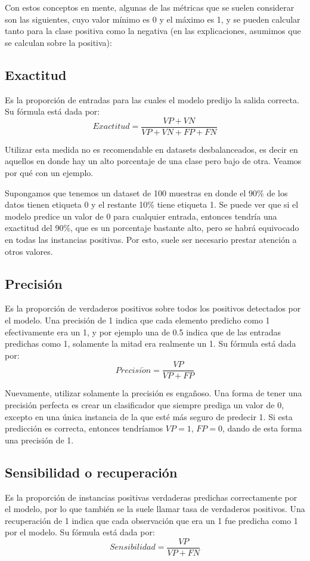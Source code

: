 \documentclass[../../main.tex]{subfiles}
\begin{document}
Con estos conceptos en mente, algunas de las métricas que se suelen considerar son las
siguientes, cuyo valor mínimo es 0 y el máximo es 1, y se pueden calcular tanto para la
clase positiva como la negativa (en las explicaciones, asumimos que se calculan sobre la
positiva):

\subsection{Exactitud}
Es la proporción de entradas para las cuales el modelo predijo la salida correcta.
Su fórmula está dada por:
\[
    Exactitud = \frac{VP + VN}{VP + VN + FP + FN}
\]

Utilizar esta medida no es recomendable en datasets desbalanceados, es decir en aquellos
en donde hay un alto porcentaje de una clase pero bajo de otra. Veamos por qué con un
ejemplo.

Supongamos que tenemos un dataset de 100 muestras en donde el 90\% de los datos tienen
etiqueta 0 y el restante 10\% tiene etiqueta 1. Se puede ver que si el modelo predice un
valor de 0 para cualquier entrada, entonces tendría una exactitud del 90\%, que es un
porcentaje bastante alto, pero se habrá equivocado en todas las instancias positivas.
Por esto, suele ser necesario prestar atención a otros valores.

\subsection{Precisión}
Es la proporción de verdaderos positivos sobre todos los positivos detectados por el
modelo. Una precisión de 1 indica que cada elemento predicho como 1 efectivamente
era un 1, y por ejemplo una de 0.5 indica que de las entradas predichas como 1,
solamente la mitad era realmente un 1. Su fórmula está dada por:
\[
    Precisi\acute{o}n = \frac{VP}{VP + FP}
\]

Nuevamente, utilizar solamente la precisión es engañoso. Una forma de tener una precisión
perfecta es crear un clasificador que siempre prediga un valor de 0, excepto en una única
instancia de la que esté más seguro de predecir 1. Si esta predicción es correcta,
entonces tendríamos \(VP=1\), \(FP=0\), dando de esta forma una precisión de 1.

\subsection{Sensibilidad o recuperación}
Es la proporción de instancias positivas verdaderas predichas correctamente por el modelo,
por lo que también se la suele llamar tasa de verdaderos positivos. Una recuperación de 1
indica que cada observación que era un 1 fue predicha como 1 por el modelo. Su fórmula
está dada por:
\[
    Sensibilidad = \frac{VP}{VP + FN}
\]
\end{document}
